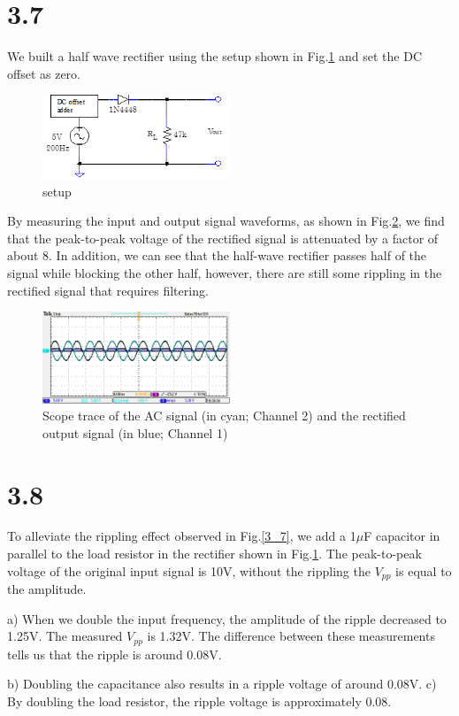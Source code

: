\documentclass[authoryear, 12pt,5p, times]{elsarticle}
\begin{document}
\section*{3.7}\label{3_7_q}
We built a half wave rectifier using the setup shown in Fig.\ref{3_7_setup} and set the DC offset as zero. 
\begin{figure}[h!]
\center
\includegraphics[width=0.5\textwidth]{figure/3_7_setup}
\caption{ setup}
\label{3_7_setup}
\end{figure}
By measuring the input and output signal waveforms, as shown in Fig.\ref{3_7_trace}, we find that the peak-to-peak voltage of the rectified signal is attenuated by a factor of about 8. In addition, we can see that the half-wave rectifier passes half of the signal while blocking the other half, however, there are still some rippling in the rectified signal that requires filtering.
\begin{figure}[h!]
\center
\includegraphics[width=0.5\textwidth]{figure/3_7}
\caption{Scope trace of the AC signal (in cyan; Channel 2) and the rectified output signal (in blue; Channel 1)}
\label{3_7_trace}
\end{figure}
\section*{3.8}
To alleviate the rippling effect observed in Fig.\ref{3_7}, we add a 1$\mu$F capacitor in parallel to the load resistor in the rectifier shown in Fig.\ref{3_7_setup}. The peak-to-peak voltage of the original input signal  is 10V, without the rippling the $V_{pp}$ is equal to the amplitude.
\par a) When we double the input frequency, the amplitude of the ripple  decreased to 1.25V. The measured $V_{pp}$ is 1.32V. The difference between these measurements tells us that the ripple is around 0.08V.  
\par  b) Doubling the capacitance also results in a ripple voltage of around 0.08V.
c) By doubling the load resistor, the ripple  voltage is approximately 0.08.
\end{document}
